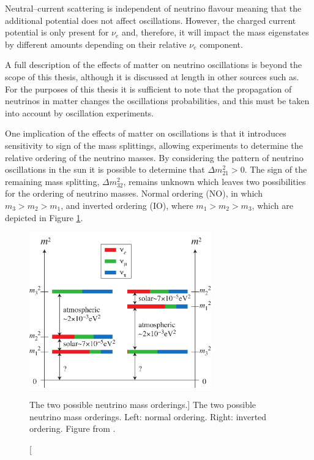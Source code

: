 Neutral--current scattering is independent of neutrino flavour meaning that
the additional potential does not affect oscillations. However, the charged
current potential is only present for $\nu_e$ and, therefore, it will impact the
mass eigenstates by different amounts depending on their relative $\nu_e$
component.

A full description of the effects of matter on neutrino oscillations is beyond
the scope of this thesis, although it is discussed at length in other sources
such as\cite{GiuntiCarlo2007FoNP}. For the purposes of this thesis it is
sufficient to note that the propagation of neutrinos in matter changes the
oscillations probabilities, and this must be taken into account by oscillation
experiments.

One implication of the effects of matter on oscillations is that it introduces
sensitivity to sign of the mass splittings\cite{GiuntiCarlo2007FoNP}, 
allowing experiments to determine the relative ordering of the neutrino 
masses. By considering the pattern of neutrino oscillations in the sun it is 
possible to determine that $\Delta m_{21}^2 > 0$\cite{PhysRevD.98.030001}. 
The sign of the remaining mass splitting, $\Delta m_{32}^2$, remains unknown 
which leaves two possibilities for the ordering of neutrino masses. Normal 
ordering (NO), in which $m_3 > m_2 > m_1$, and inverted ordering (IO), where $m_1 > m_2 
> m_3$, which are depicted in Figure \ref{fig:mass_ordering}. 
\begin{figure}
	\centering
	\includegraphics[width=0.7\textwidth]{figures/mass.pdf}
	\caption
	[The two possible neutrino mass orderings.]
	{The two possible neutrino mass orderings. Left: normal ordering. Right: 
	inverted ordering.  Figure from \cite{SKing}.}
	\label{fig:mass_ordering}
\end{figure}

